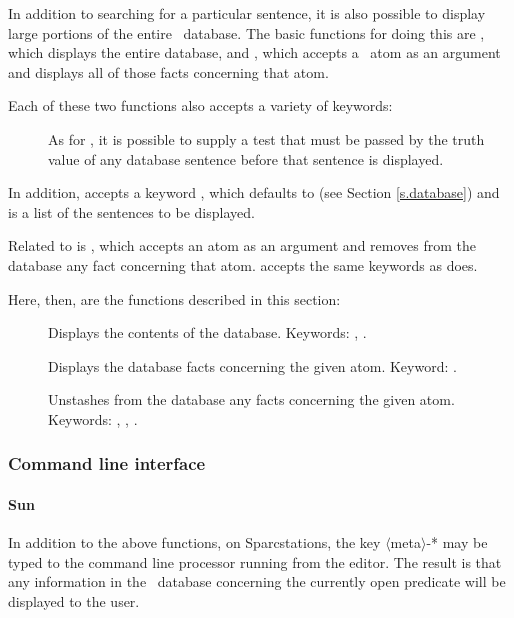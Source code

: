 In addition to searching for a particular sentence, it is also
possible to display large portions of the entire \mvl\ database.  The
basic functions for doing this are , which displays
the entire database, and , which accepts a \lisp\ atom
as an argument and displays all of those facts concerning that atom.

Each of these two functions also accepts a variety of keywords:
 \begin{description}
 \item [] As for , it is possible to
supply a test that must be passed by the truth value of any database
sentence before that sentence is displayed.
 \end{description}
 In addition,  accepts a keyword , which
defaults to  (see Section \ref{s.database}) and is a
list of the sentences to be displayed.

Related to  is , which
accepts an atom as an argument and removes from the database any
fact concerning that atom.   accepts
the same keywords as  does.

Here, then, are the functions described in this section:

\begin{description}
 \item [] Displays the contents of the database.  Keywords:
, .
 \item [] Displays the database facts concerning the
given atom.  Keyword: .
 \item [] Unstashes from the
database any facts concerning the given atom.  Keywords:
, , \apa.
 \end{description}

\subsubsection{Command line interface}

\paragraph{Sun}
In addition to the above functions, on Sparcstations, the key
$\langle$meta$\rangle$-* may be typed to the command line processor
running from the editor.  The result is that any information in the \mvl\
database concerning the currently open predicate will be displayed to the
user.

